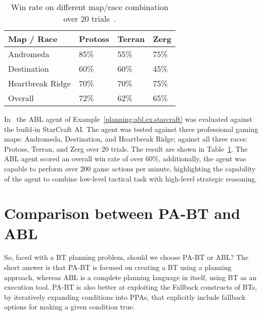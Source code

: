 \begin{table}
\begin{center}

   \begin{tabular}{| l | l | l | l |}
    \hline
    Map / Race &  Protoss & Terran & Zerg \\ \hline \hline
	Andromeda & 85\% & 55\% & 75\% \\
	Destination & 60\% & 60\% & 45\% \\
	Heartbreak Ridge & 70\% & 70\% & 75\% \\
	Overall & 72\% & 62\% & 65\% \\
    \hline
    \end{tabular}
    \end{center} 
    \caption{Win rate on different map/race combination over 20 trials~\cite{weber2010reactive}.}
    \label{planning:abl.tab.starcraftresult}
\end{table}


In~\cite{weber2010reactive} the ABL agent of Example~\ref{planning:abl.ex.starcraft} was evaluated against the build-in StarCraft AI. The agent was tested against three professional gaming maps: Andromeda, Destination, and Heartbreak Ridge; against all three races: Protoss, Terran, and Zerg over 20 trials. The result are shown in Table~\ref{planning:abl.tab.starcraftresult}. The ABL agent scored an overall win rate of over 60\%, additionally, the agent was capable to perform over 200 game actions per minute, highlighting the capability of the agent to combine low-level tactical task with high-level strategic reasoning.

\section{Comparison between PA-BT and ABL}
So, faced with a BT planning problem, should we choose PA-BT or ABL?
The short answer is that PA-BT is focused on creating a BT using a planning approach,
whereas ABL is a complete planning language in itself, using BT as an execution tool.
PA-BT is also better at exploiting the Fallback constructs of BTs, by iteratively expanding conditions into  PPAs,
that explicitly include fallback options for making a given condition true.

